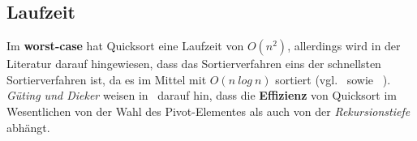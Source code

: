 \subsection{Laufzeit}
Im \textbf{worst-case} hat Quicksort eine Laufzeit von $O(n^2)$, allerdings wird in der Literatur darauf hingewiesen, dass das Sortierverfahren eins der schnellsten Sortierverfahren ist, da es im Mittel mit $O(n\ log\ n)$ sortiert (vgl.~\cite[92]{OW17b} sowie ~\cite[173]{GD18e}).\\
\textit{Güting und Dieker} weisen in~\cite[182 f.]{GD18e} darauf hin, dass die \textbf{Effizienz} von Quicksort im Wesentlichen von der Wahl des Pivot-Elementes als auch von der \textit{Rekursionstiefe} abhängt.